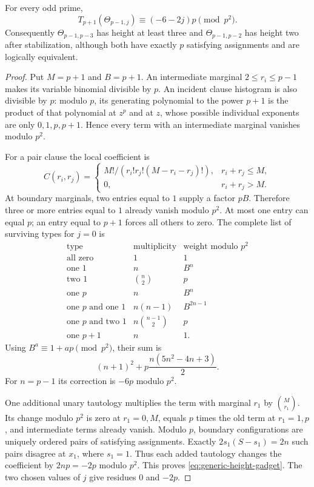 \begin{proposition}
For every odd prime,
\begin{equation}\label{eq:generic-height-gadget}
 T_{p+1}(\Theta_{p-1,j})\equiv(-6-2j)p\pmod {p^2}.
\end{equation}
Consequently $\Theta_{p-1,p-3}$ has height at least three and
$\Theta_{p-1,p-2}$ has height two after stabilization, although both
have exactly $p$ satisfying assignments and are logically equivalent.
\end{proposition}
\begin{proof}
Put $M=p+1$ and $B=p+1$.  An intermediate marginal
$2\leq r_i\leq p-1$ makes its variable binomial divisible by $p$.
An incident clause histogram is also divisible by $p$: modulo $p$,
its generating polynomial to the power $p+1$ is the product of that
polynomial at $z^p$ and at $z$, whose possible individual exponents
are only $0,1,p,p+1$.  Hence every term with an intermediate marginal
vanishes modulo $p^2$.

For a pair clause the local coefficient is
\[
 C(r_i,r_j)=
 \begin{cases}
 M!/(r_i!r_j!(M-r_i-r_j)!),&r_i+r_j\leq M,\\
 0,&r_i+r_j>M.
 \end{cases}
\]
At boundary marginals, two entries equal to $1$ supply a factor
$pB$.  Therefore three or more entries equal to $1$ already vanish
modulo $p^2$.  At most one entry can equal $p$; an entry equal to
$p+1$ forces all others to zero.  The complete list of surviving
types for $j=0$ is
\[
\begin{array}{c|c|c}
\text{type}&\text{multiplicity}&\text{weight modulo }p^2\\\hline
\text{all zero}&1&1\\
\text{one }1&n&B^n\\
\text{two }1&\binom n2&p\\
\text{one }p&n&B^n\\
\text{one }p\text{ and one }1&n(n-1)&B^{2n-1}\\
\text{one }p\text{ and two }1&n\binom{n-1}2&p\\
\text{one }p+1&n&1.
\end{array}
\]
Using $B^a\equiv1+ap\pmod{p^2}$, their sum is
\[
 (n+1)^2+p\frac{n(5n^2-4n+3)}2.
\]
For $n=p-1$ its correction is $-6p$ modulo $p^2$.

One additional unary tautology multiplies the term with marginal
$r_1$ by $\binom M{r_1}$.  Its change modulo $p^2$ is zero at
$r_1=0,M$, equals $p$ times the old term at $r_1=1,p$, and
intermediate terms already vanish.  Modulo $p$, boundary configurations
are uniquely ordered pairs of satisfying assignments.  Exactly
$2s_1(S-s_1)=2n$ such pairs disagree at $x_1$, where $s_1=1$.
Thus each added tautology changes the coefficient by $2np=-2p$
modulo $p^2$.  This proves \eqref{eq:generic-height-gadget}.
The two chosen values of $j$ give residues $0$ and $-2p$.
\end{proof}

